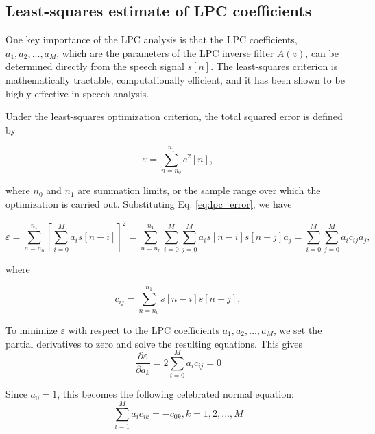\documentclass[12pt, a4paper, twoside]{report}
\begin{document}
\subsection{Least-squares estimate of LPC coefficients}
One key importance of the LPC analysis is that the LPC coefficients, $a_1, a_2, ..., a_M$, which are the parameters of the LPC inverse filter $A(z)$, can be determined directly from the speech signal $s[n]$. The least-squares criterion is mathematically tractable, computationally efficient, and it has been shown to be highly effective in speech analysis.

Under the least-squares optimization criterion, the total squared error is defined by

\begin{equation}
\varepsilon = \sum_{n=n_0}^{n_1} e^2[n],
\end{equation}

where $n_0$ and $n_1$ are summation limits, or the sample range over which the optimization is carried out. Substituting Eq. \ref{eq:lpc_error}, we have

\begin{equation*}
\varepsilon = \sum_{n=n_0}^{n_1} \left [ \sum_{i=0}^{M} a_i s[n-i] \right ]^2 = \sum_{n=n_0}^{n_1} \sum_{i=0}^{M} \sum_{j=0}^{M} a_i s[n-i] s[n-j] a_j = \sum_{i=0}^{M} \sum_{j=0}^{M} a_i c_{ij} a_j,
\end{equation*}

where

\begin{equation*}
c_{ij} = \sum_{n=n_0}^{n_1} s[n-i] s[n-j],
\end{equation*}

To minimize $\varepsilon$ with respect to the LPC coefficients $a_1, a_2, ..., a_M$, we set the partial derivatives to zero and solve the resulting equations. This gives
\begin{equation*}
\frac{\partial \varepsilon }{\partial a_k} = 2 \sum_{i=0}^{M} a_i c_{ij} = 0
\end{equation*}

Since $a_0 = 1$, this becomes the following celebrated normal equation:
\begin{equation*}
\sum_{i=1}^{M} a_i c_{ik} = -c_{0k}, k = 1, 2,..., M
\end{equation*}
\end{document}
